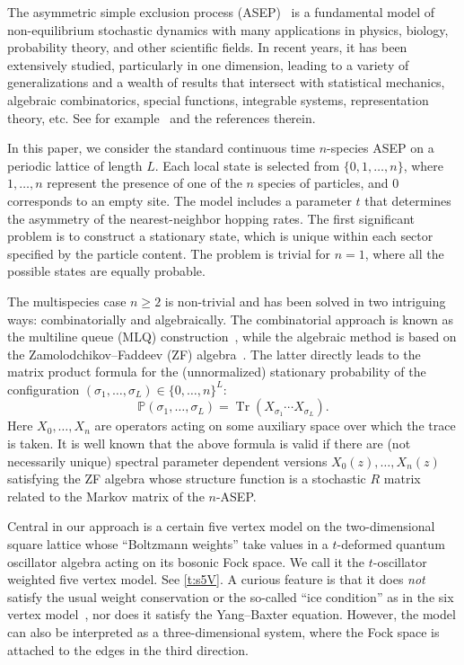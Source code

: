 \documentclass[11pt]{article}
\theoremstyle{definition}
\numberwithin{equation}{section}
\DeclareMathOperator{\tr}{Tr}
\begin{document}
The asymmetric simple exclusion process (ASEP)~\cite{MGP,Sp} is a fundamental model of non-equi\-lib\-ri\-um stochastic dynamics with many applications in physics, biology, probability theory, and other scientific fields. 
In recent years, it has been extensively studied, particularly in one dimension, leading to a variety of generalizations and a wealth of results that intersect with statistical mechanics, algebraic combinatorics, special functions, integrable systems, 
representation theory, etc.
See for example~\cite{ANP, AKSS, BW, CDW, CMW, CRV, Martin20, PEM} and the references therein.

In this paper, we consider the standard continuous time $n$-species ASEP on a periodic lattice of length $L$. 
Each local state is selected from $\{0,1,\ldots, n\}$, where $1,\ldots, n$ represent the presence of one of the $n$ species of particles, and $0$ corresponds to an empty site. 
The model includes a parameter $t$ that determines the asymmetry of the nearest-neighbor hopping rates. 
The first significant problem is to construct a stationary state, which is unique within each sector specified by the particle content.
The problem is trivial for $n=1$, where all the possible states are equally probable.

The multispecies case $n\ge 2$ is non-trivial and has been solved in two intriguing ways: combinatorially and algebraically. 
The combinatorial approach is known 
as the multiline queue (MLQ) construction~\cite{CMW,Martin20}, 
while the algebraic method is based on the 
Zamolodchikov--Faddeev (ZF) algebra~\cite{CDW,PEM}.
The latter directly leads to the matrix product formula for the (unnormalized) 
stationary probability of the configuration $(\sigma_1,\ldots, \sigma_L) \in \{0,\ldots, n\}^L$:
\[
\mathbb{P}(\sigma_1,\ldots, \sigma_L) = \tr(X_{\sigma_1} \cdots X_{\sigma_L}).
\]
Here $X_0,\ldots, X_n$ are operators acting on some auxiliary space over which the trace is taken.
It is well known that the above formula is valid if there are (not necessarily unique)
spectral parameter dependent versions
$X_0(z), \ldots, X_n(z)$ satisfying the ZF algebra whose structure function 
is a stochastic $R$ matrix related to the Markov matrix of the $n$-ASEP.

Central in our approach is a certain five vertex model 
on the two-dimensional square lattice whose ``Boltzmann weights'' 
take values in a $t$-deformed quantum oscillator algebra acting on its bosonic Fock space. 
We call it the $t$-oscillator weighted five vertex model. See \eqref{t:s5V}. 
A curious feature is that it does {\em not} satisfy the usual weight conservation
or the so-called  ``ice condition'' as in the six vertex model~\cite{Bax}, nor does it satisfy the Yang--Baxter equation.
However, the model can also be interpreted as a three-dimensional system, where the Fock space is attached to the edges in the third direction.
\end{document}
